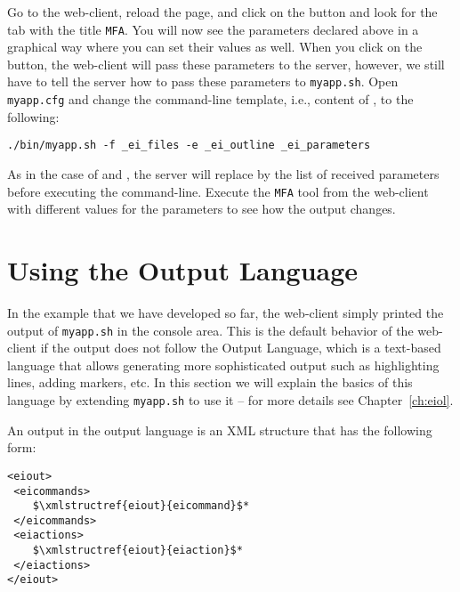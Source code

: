 Go to the web-client, reload the page, and click on the \settingbutton
button and look for the tab with the title \texttt{MFA}.  You will now
see the parameters declared above in a graphical way where you can set
their values as well.  When you click on the \applybutton button, the
web-client will pass these parameters to the server, however, we still
have to tell the server how to pass these parameters to
\texttt{myapp.sh}. Open \texttt{myapp.cfg} and change the command-line
template, i.e., content of , to the following:

\medskip
\begin{lstlisting}
./bin/myapp.sh -f _ei_files -e _ei_outline _ei_parameters
\end{lstlisting}

\medskip
\noindent
As in the case of  and , the server
will replace  by the list of received parameters before
executing the command-line. Execute the \texttt{MFA} tool from
the web-client with different values for the parameters to see how the
output changes.

\section{Using the \ei Output Language}

In the example that we have developed so far, the web-client simply
printed the output of \texttt{myapp.sh} in the console area. This is
the default behavior of the web-client if the output does not follow
the \ei Output Language, which is a text-based language that allows
generating more sophisticated output such as highlighting lines,
adding markers, etc.
%
In this section we will explain the basics of this language by
extending \texttt{myapp.sh} to use it -- for more details see
Chapter~\ref{ch:eiol}.

An output in the \ei output language is an XML structure that has the
following form:

\medskip
\noindent
\begin{lstlisting}
<eiout> 
 <eicommands>
    $\xmlstructref{eiout}{eicommand}$*
 </eicommands>
 <eiactions>
    $\xmlstructref{eiout}{eiaction}$*
 </eiactions>
</eiout>
\end{lstlisting}

